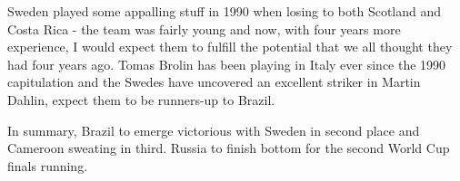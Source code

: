 Sweden played some appalling stuff in 1990 when losing to both Scotland and
Costa Rica - the team was fairly young and now, with four years more 
experience, I would expect them to fulfill the potential that we all thought 
they had four years ago. Tomas Brolin has been playing in Italy ever since the 
1990 capitulation and the Swedes have uncovered an excellent striker in Martin 
Dahlin, expect them to be runners-up to Brazil.

In summary, Brazil to emerge victorious with Sweden in second place and 
Cameroon sweating in third. Russia to finish bottom for the second World Cup
finals running.
